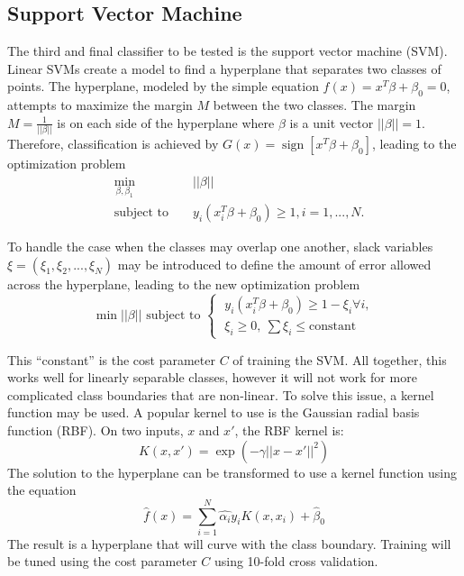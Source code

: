 \documentclass[twoside,11pt]{article}
\DeclareMathOperator{\sign}{sign}
\begin{document}
\subsection{Support Vector Machine}
The third and final classifier to be tested is the support vector machine
(SVM).  Linear SVMs create a model to find a hyperplane that separates two
classes of points.  The hyperplane, modeled by the simple equation $f(x) = x^T
\beta + \beta_0 = 0$, attempts to maximize the margin $M$ between the two
classes.  The margin $M = \frac{1}{||\beta||}$ is on each side of the
hyperplane where $\beta$ is a unit vector $||\beta|| = 1$.  Therefore,
classification is achieved by $G(x) = \sign[x^T\beta + \beta_0]$, leading to
the optimization problem 
\begin{equation*}
  \begin{aligned}
  &\min_{\beta, \beta_1} &&||\beta|| \\
  &\text{subject to } && y_i (x_i^T \beta + \beta_0) \geq 1, i = 1,...,N.
  \end{aligned}
\end{equation*}

To handle the case when the classes may overlap one another, slack variables
$\xi = (\xi_1, \xi_2,...,\xi_N)$ may be introduced to define the amount of
error allowed across the hyperplane, leading to the new optimization problem  
\begin{equation}
  \min ||\beta|| \text{ subject to } \begin{cases}
    \; y_i(x_i^T\beta + \beta_0) \geq 1 - \xi_i \forall i,\\
    \; \xi_i \geq 0,\: \sum \xi_i \leq \text{constant}
  \end{cases}
\end{equation}

This ``constant'' is the cost parameter $C$ of training the SVM.  All together,
this works well for linearly separable classes, however it will not work for
more complicated class boundaries that are non-linear.  To solve this issue, a
kernel function may be used.  A popular kernel to use is the Gaussian radial
basis function (RBF).  On two inputs, $x$ and $x'$, the RBF kernel is:
\begin{equation}
  K(x, x') = \exp(-\gamma||x - x'||^2)
\end{equation}                          %
The solution to the hyperplane can be transformed to use a kernel function using the equation
\begin{equation}
  \hat{f}(x) = \sum_{i=1}^N\hat{\alpha_i} y_i K(x,x_i) + \hat{\beta}_0
\end{equation}
The result is a hyperplane that will curve with the class boundary.  Training
will be tuned using the cost parameter $C$ using 10-fold cross validation.
\end{document}
